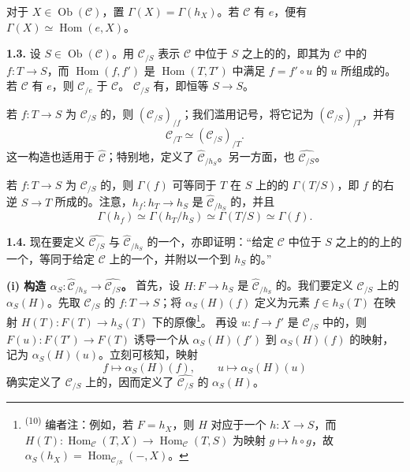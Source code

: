 对于 $X\in\operatorname{Ob}(\mathcal C)$，置 $\Gamma(X)=\Gamma(h_X)$。若 $\mathcal C$ 有 $e$，便有 $\Gamma(X)\simeq\operatorname{Hom}(e,X)$。

\textbf{1.3.} 设 $S\in\operatorname{Ob}(\mathcal C)$。用 $\mathcal C_{/S}$ 表示 $\mathcal C$ 中位于 $S$ 之上的的，即其为 $\mathcal C$ 中的 $f:T\to S$，而 $\operatorname{Hom}(f,f')$ 是 $\operatorname{Hom}(T,T')$ 中满足 $f=f'\circ u$ 的 $u$ 所组成的。若 $\mathcal C$ 有 $e$，则 $\mathcal C_{/e}$ 于 $\mathcal C$。 $\mathcal C_{/S}$ 有，即恒等 $S\to S$。

若 $f:T\to S$ 为 $\mathcal C_{/S}$ 的，则 $(\mathcal C_{/S})_{/f}$；我们滥用记号，将它记为 $(\mathcal C_{/S})_{/T}$，并有
\[
\mathcal C_{/T}\simeq(\mathcal C_{/S})_{/T}.
\]
这一构造也适用于 $\widehat{\mathcal C}$；特别地，定义了 $\widehat{\mathcal C}_{/h_S}$。另一方面，也 $\widehat{\mathcal C_{/S}}$。

若 $f:T\to S$ 为 $\mathcal C_{/S}$ 的，则 $\Gamma(f)$ 可等同于 $T$ 在 $S$ 上的的 $\Gamma(T/S)$，即 $f$ 的右逆 $S\to T$ 所成的。注意，$h_f:h_T\to h_S$ 是 $\widehat{\mathcal C}_{/h_S}$ 的，并且
\[
\Gamma(h_f)\simeq\Gamma(h_T/h_S)\simeq\Gamma(T/S)\simeq\Gamma(f).
\]

\textbf{1.4.} 现在要定义 $\widehat{\mathcal C_{/S}}$ 与 $\widehat{\mathcal C}_{/h_S}$ 的一个，亦即证明：“给定 $\mathcal C$ 中位于 $S$ 之上的的上的一个，等同于给定 $\mathcal C$ 上的一个，并附以一个到 $h_S$ 的。”

\textbf{(i) 构造 $\alpha_S:\widehat{\mathcal C}_{/h_S}\to\widehat{\mathcal C_{/S}}$。}
首先，设 $H:F\to h_S$ 是 $\widehat{\mathcal C}_{/h_S}$ 的。我们要定义 $\mathcal C_{/S}$ 上的 $\alpha_S(H)$。先取 $\mathcal C_{/S}$ 的 $f:T\to S$；将 $\alpha_S(H)(f)$ 定义为元素 $f\in h_S(T)$ 在映射 $H(T):F(T)\to h_S(T)$ 下的原像\footnote{\textsuperscript{(10)} 编者注：例如，若 $F=h_X$，则 $H$ 对应于一个 $h:X\to S$，而 $H(T):\operatorname{Hom}_{\mathcal C}(T,X)\to\operatorname{Hom}_{\mathcal C}(T,S)$ 为映射 $g\mapsto h\circ g$，故 $\alpha_S(h_X)=\operatorname{Hom}_{\mathcal C_{/S}}(-,X)$。}。
再设 $u:f\to f'$ 是 $\mathcal C_{/S}$ 中的，则 $F(u):F(T')\to F(T)$ 诱导一个从 $\alpha_S(H)(f')$ 到 $\alpha_S(H)(f)$ 的映射，记为 $\alpha_S(H)(u)$。立刻可核知，映射
\[
f\longmapsto\alpha_S(H)(f),\qquad u\longmapsto\alpha_S(H)(u)
\]
确实定义了 $\mathcal C_{/S}$ 上的，因而定义了 $\widehat{\mathcal C_{/S}}$ 的 $\alpha_S(H)$。


